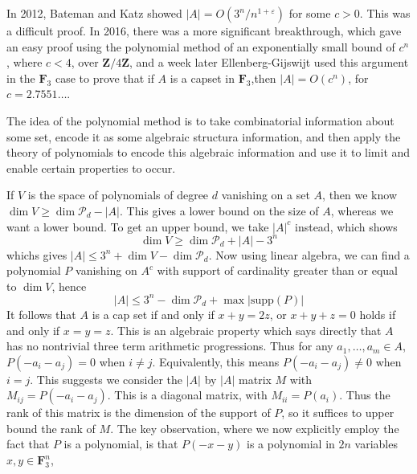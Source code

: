 In 2012, Bateman and Katz showed $|A| = O(3^n/n^{1 + \varepsilon})$ for some $c > 0$. This was a difficult proof. In 2016, there was a more significant breakthrough, which gave an easy proof using the polynomial method of an exponentially small bound of $c^n$, where $c < 4$, over $\mathbf{Z}/4\mathbf{Z}$, and a week later Ellenberg-Gijswijt used this argument in the $\mathbf{F}_3$ case to prove that if $A$ is a capset in $\mathbf{F}_3$,then $|A| = O(c^n)$, for $c = 2.7551\dots$.

The idea of the polynomial method is to take combinatorial information about some set, encode it as some algebraic structura information, and then apply the theory of polynomials to encode this algebraic information and use it to limit and enable certain properties to occur.

If $V$ is the space of polynomials of degree $d$ vanishing on a set $A$, then we know $\dim V \geq \dim \mathcal{P}_d - |A|$. This gives a lower bound on the size of $A$, whereas we want a lower bound. To get an upper bound, we take $|A|^c$ instead, which shows
%
\[ \dim V \geq \dim \mathcal{P}_d + |A| - 3^n \]
%
whichs gives $|A| \leq 3^n + \dim V - \dim \mathcal{P}_d$. Now using linear algebra, we can find a polynomial $P$ vanishing on $A^c$ with support of cardinality greater than or equal to $\dim V$, hence
%
\[ |A| \leq 3^n - \dim \mathcal{P}_d + \max |\text{supp}(P)| \]
%
It follows that $A$ is a cap set if and only if $x + y = 2z$, or $x + y + z = 0$ holds if and only if $x = y = z$. This is an algebraic property which says directly that $A$ has no nontrivial three term arithmetic progressions. Thus for any $a_1, \dots, a_m \in A$, $P(-a_i-a_j) = 0$ when $i \neq j$. Equivalently, this means $P(-a_i-a_j) \neq 0$ when $i = j$. This suggests we consider the $|A|$ by $|A|$ matrix $M$ with $M_{ij} = P(-a_i-a_j)$. This is a diagonal matrix, with $M_{ii} = P(a_i)$. Thus the rank of this matrix is the dimension of the support of $P$, so it suffices to upper bound the rank of $M$. The key observation, where we now explicitly employ the fact that $P$ is a polynomial, is that $P(-x-y)$ is a polynomial in $2n$ variables $x,y \in \mathbf{F}_3^n$,


